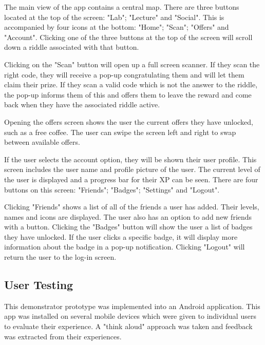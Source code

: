 \documentclass[10pt,twocolumn]{article} %
\begin{document}
The main view of the app contains a central map. There are three buttons located at the top of the screen: "Lab"; "Lecture" and "Social". This is accompanied by four icons at the bottom: "Home";  "Scan"; "Offers" and "Account". Clicking one of the three buttons at the top of the screen will scroll down a riddle associated with that button.

Clicking on the "Scan" button will open up a full screen scanner. If they scan the right code, they will receive a pop-up congratulating them and will let them claim their prize. If they scan a valid code which is not the answer to the riddle, the pop-up informs them of this and offers them to leave the reward and come back when they have the associated riddle active.

Opening the offers screen shows the user the current offers they have unlocked, such as a free coffee. The user can swipe the screen left and right to swap between available offers.

If the user selects the account option, they will be shown their user profile. This screen includes the user name and profile picture of the user. The current level of the user is displayed and a progress bar for their XP can be seen. There are four buttons on this screen: "Friends"; "Badges"; "Settings" and "Logout".

Clicking "Friends" shows a list of all of the friends a user has added. Their levels, names and icons are displayed. The user also has an option to add new friends with a button. Clicking the "Badges" button will show the user a list of badges they have unlocked. If the user clicks a specific badge, it will display more information about the badge in a pop-up notification. Clicking "Logout" will return the user to the log-in screen.

\subsection*{User Testing}
This demonstrator prototype was implemented into an Android application. This app was installed on several mobile devices which were given to individual users to evaluate their experience. A "think aloud" approach was taken and feedback was extracted from their experiences.
\end{document}
